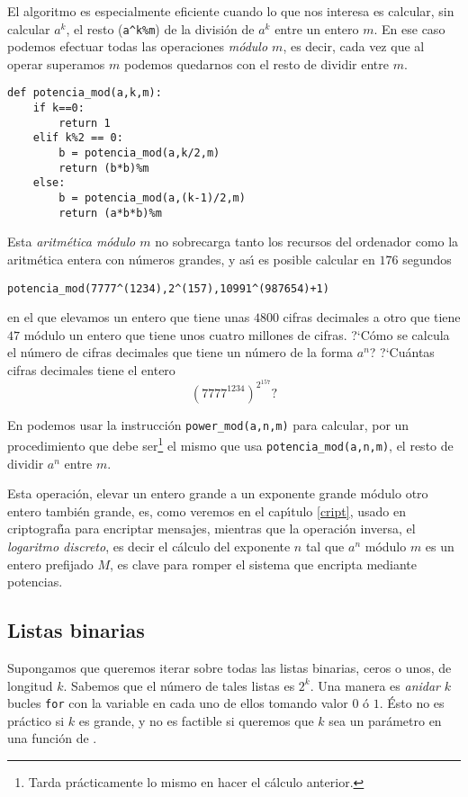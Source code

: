 El algoritmo es especialmente eficiente cuando lo que nos interesa es calcular,
sin calcular $a^k$, el resto (\lstinline|a^k%m|) de la divisi\'on de $a^k$ entre
un entero $m$. En ese caso podemos efectuar todas las operaciones {\itshape
m\'odulo $m$}, es decir, cada vez que al operar superamos $m$ podemos quedarnos
con el resto de dividir entre $m$.  
 
\begin{lstlisting}[columns=spaceflexible]
def potencia_mod(a,k,m):
    if k==0:
        return 1
    elif k%2 == 0:
        b = potencia_mod(a,k/2,m)
        return (b*b)%m
    else:
        b = potencia_mod(a,(k-1)/2,m)
        return (a*b*b)%m
\end{lstlisting}


Esta {\itshape aritm\'etica m\'odulo $m$} no
sobrecarga tanto los recursos del ordenador como la aritm\'etica entera con
n\'umeros grandes, y as\'{\i} es posible calcular en $176$ segundos 
 \begin{center}
 \lstinline|potencia_mod(7777^(1234),2^(157),10991^(987654)+1)|
 \end{center}
 \noindent en el que elevamos un entero que tiene unas $4800$ cifras decimales a
otro que tiene $47$ m\'odulo un entero que tiene unos cuatro millones de
cifras. ?`C\'omo se calcula el n\'umero de cifras decimales que tiene un
n\'umero de la forma $a^n$? ?`Cu\'antas cifras decimales tiene el entero 
\[(7777^{1234})^{2^{157}}?\]

En {\sage} podemos usar la instrucci\'on \lstinline|power_mod(a,n,m)| para
calcular, por un procedimiento que debe ser\footnote{Tarda pr\'acticamente lo
mismo en hacer el c\'alculo anterior.}  el mismo que usa
\lstinline|potencia_mod(a,n,m)|, el resto de dividir $a^n$ entre $m$.



Esta operaci\'on, elevar un entero grande a un exponente grande m\'odulo otro
entero tambi\'en grande, es, como veremos en el cap\'{\i}tulo \ref{cript}, 
usado en criptograf\'{\i}a para encriptar mensajes, mientras que la
operaci\'on inversa, el {\itshape logaritmo discreto}, es decir el c\'alculo del
exponente $n$ tal que $a^n$ m\'odulo $m$ es un entero prefijado $M$, es clave
para romper el sistema que encripta mediante potencias.


\subsection{Listas binarias}
Supongamos que queremos iterar sobre todas las listas binarias, ceros o unos, de
longitud $k$. Sabemos que el n\'umero de tales listas es  $2^k.$  Una manera es
{\itshape anidar} $k$ bucles \lstinline|for| con la variable en cada uno de
ellos
tomando valor $0$ \'o $1$. \'Esto no es pr\'actico si $k$ es grande, y no es
factible si queremos que $k$ sea un par\'ametro en una funci\'on de \sage. 

